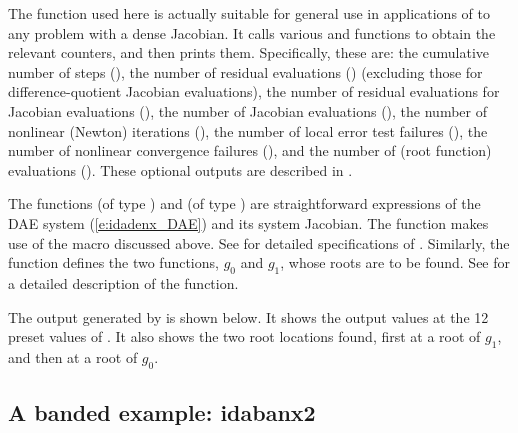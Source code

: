 The function  used here is actually suitable for
general use in applications of {\ida} to any problem with a dense
Jacobian.  It calls various  and 
functions to obtain the relevant counters, and then prints them.
Specifically, these are: the cumulative number of steps (), 
the number of residual evaluations () (excluding those for
difference-quotient Jacobian evaluations),
the number of residual evaluations for Jacobian evaluations (),
the number of Jacobian evaluations (),
the number of nonlinear (Newton) iterations (),
the number of local error test failures (),
the number of nonlinear convergence failures (),
and the number of  (root function) evaluations ().
These optional outputs are described in .

The functions  (of type ) and  (of type
) are straightforward expressions of the DAE system
(\ref{e:idadenx_DAE}) and its system Jacobian.  The function 
makes use of the macro  discussed above.  See 
for detailed specifications of .  Similarly, the function
 defines the two functions, $g_0$ and $g_1$, whose roots are
to be found.  See  for a detailed description of the
 function.

The output generated by  is shown below.  It shows the output
values at the 12 preset values of .  It also shows the two root
locations found, first at a root of $g_1$, and then at a root of $g_0$.

\subsection{A banded example: idabanx2}\label{ss:idabanx2}

